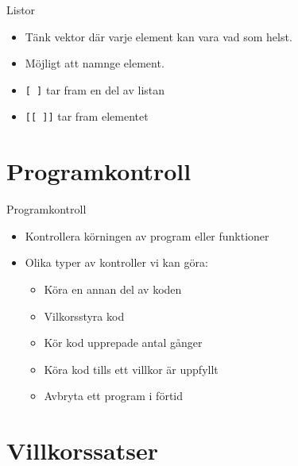\documentclass[
  11pt,
  ignorenonframetext,
]{beamer}
\providecommand{\tightlist}{%
  \setlength{\itemsep}{0pt}\setlength{\parskip}{0pt}}
\begin{document}
\begin{frame}{Listor}
\label{listor}
\begin{itemize}
\tightlist
\item
  Tänk vektor där varje element kan vara vad som helst.
\item
  Möjligt att namnge element.
\item
  \texttt{[ ]} tar fram en del av listan
\item
  \texttt{[[ ]]} tar fram elementet
\end{itemize}
\end{frame}

\section{Programkontroll}\label{programkontroll}

\begin{frame}{Programkontroll}
\label{programkontroll-1}
\begin{itemize}
\tightlist
\item
  Kontrollera körningen av program eller funktioner
\item
  Olika typer av kontroller vi kan göra:

  \begin{itemize}
  \tightlist
  \item
    Köra en annan del av koden
  \item
    Vilkorsstyra kod
  \item
    Kör kod upprepade antal gånger
  \item
    Köra kod tills ett villkor är uppfyllt
  \item
    Avbryta ett program i förtid
  \end{itemize}
\end{itemize}
\end{frame}

\section{Villkorssatser}\label{villkorssatser}
\end{document}
